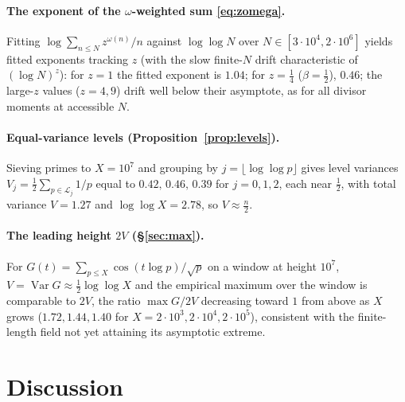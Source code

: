 \documentclass[11pt]{amsart}
\theoremstyle{definition}
\newcommand{\Var}{\operatorname{Var}}
\newcommand{\loglog}{\log\log}
\begin{document}
\paragraph{The exponent of the $\omega$-weighted sum \eqref{eq:zomega}.} Fitting
$\log\sum_{n\le N}z^{\omega(n)}/n$ against $\log\log N$ over $N\in[3\cdot10^4,2\cdot10^6]$ yields fitted exponents
tracking $z$ (with the slow finite-$N$ drift characteristic of $(\log N)^z$): for $z=1$ the fitted exponent is
$1.04$; for $z=\tfrac14$ ($\beta=\tfrac12$), $0.46$; the large-$z$ values ($z=4,9$) drift well below their
asymptote, as for all divisor moments at accessible $N$.

\paragraph{Equal-variance levels (Proposition~\ref{prop:levels}).} Sieving primes to $X=10^7$ and grouping by
$j=\lfloor\loglog p\rfloor$ gives level variances $V_j=\tfrac12\sum_{p\in\mathcal L_j}1/p$ equal to
$0.42,\,0.46,\,0.39$ for $j=0,1,2$, each near $\tfrac12$, with total variance $V=1.27$ and
$\loglog X=2.78$, so $V\approx\tfrac n2$.

\paragraph{The leading height $2V$ (\S\ref{sec:max}).} For $G(t)=\sum_{p\le X}\cos(t\log p)/\sqrt p$ on a window
at height $10^7$, $V=\Var G\approx\tfrac12\loglog X$ and the empirical maximum over the window is comparable to
$2V$, the ratio $\max G/2V$ decreasing toward $1$ from above as $X$ grows ($1.72,1.44,1.40$ for
$X=2\cdot10^3,2\cdot10^4,2\cdot10^5$), consistent with the finite-length field not yet attaining its asymptotic
extreme.

\section{Discussion}\label{sec:discussion}
\end{document}
